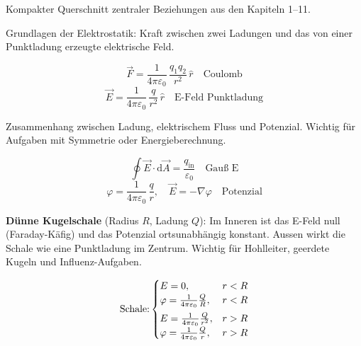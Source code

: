 

\begin{runintext}
Kompakter Querschnitt zentraler Beziehungen aus den Kapiteln 1--11.
\end{runintext}

\begin{runintext}
Grundlagen der Elektrostatik: Kraft zwischen zwei Ladungen und das von einer Punktladung erzeugte elektrische Feld.
\end{runintext}
\begin{formulabox}
\[ \vec{F} = \frac{1}{4\pi\varepsilon_0}\,\frac{q_1 q_2}{r^2}\,\hat{r} \quad \text{Coulomb} \]
\formulasep
\[ \vec{E} = \frac{1}{4\pi\varepsilon_0}\,\frac{q}{r^2}\,\hat{r} \quad \text{E-Feld Punktladung} \]
\end{formulabox}

\begin{runintext}
Zusammenhang zwischen Ladung, elektrischem Fluss und Potenzial. Wichtig für Aufgaben mit Symmetrie oder Energieberechnung.
\end{runintext}
\begin{formulabox}
\[ \oint \vec{E}\cdot\mathrm{d}\vec{A} = \frac{q_{\mathrm{in}}}{\varepsilon_0} \quad \text{Gauß E} \]
\formulasep
\[ \varphi = \frac{1}{4\pi\varepsilon_0}\,\frac{q}{r}, \quad \vec{E} = -\nabla\varphi \quad \text{Potenzial} \]
\end{formulabox}

\begin{runintext}
\textbf{Dünne Kugelschale} (Radius $R$, Ladung $Q$): Im Inneren ist das E-Feld null (Faraday-Käfig) und das Potenzial ortsunabhängig konstant. Aussen wirkt die Schale wie eine Punktladung im Zentrum. Wichtig für Hohlleiter, geerdete Kugeln und Influenz-Aufgaben.
\end{runintext}
\begin{formulabox}
\[
\text{Schale:} \begin{cases}
E = 0, \hfill & r < R \\
\varphi = \frac{1}{4\pi\varepsilon_0}\frac{Q}{R}, \hfill & r < R \\[1ex]
E = \frac{1}{4\pi\varepsilon_0}\frac{Q}{r^2}, \hfill & r > R \\
\varphi = \frac{1}{4\pi\varepsilon_0}\frac{Q}{r}, \hfill & r > R
\end{cases}
\]
\end{formulabox}

